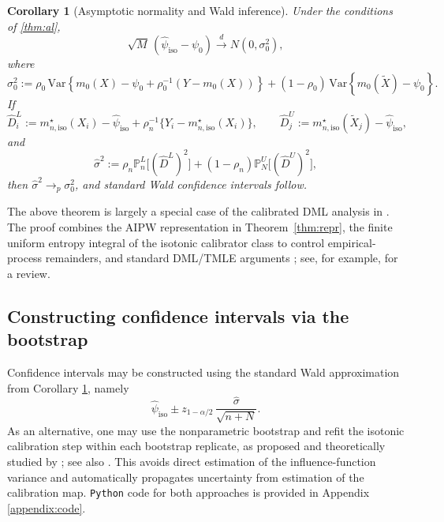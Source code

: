 \documentclass{article}
\theoremstyle{plain}
\newtheorem{corollary}{Corollary}
\theoremstyle{definition}
\newcommand{\Var}{\mathrm{Var}}
\newcommand{\1}{\mathbbm{1}}
\newcommand{\rhozero}{\rho_0}
\newcommand{\rhon}{\rho_n}
\newcommand{\Pl}{\mathbb{P}^{L}_n}
\newcommand{\Pu}{\mathbb{P}^{U}_N}
\begin{document}
\begin{corollary}[Asymptotic normality and Wald inference]
\label{cor:normal}
Under the conditions of \cref{thm:al},
\[
\sqrt{M}\,(\widehat{\psi}_{\mathrm{iso}}-\psi_0)\overset{d}{\longrightarrow}N(0,\sigma_0^2),
\]
where
\[
\sigma_0^2
:=
\rhozero\,\Var\left\{m_0(X)-\psi_0+\rhozero^{-1}(Y-m_0(X))\right\}
+
(1-\rhozero)\,\Var\left\{m_0(\widetilde X)-\psi_0\right\}.
\]
If
\[
\widehat D_i^L := m_{n,\mathrm{iso}}^\star(X_i)-\widehat{\psi}_{\mathrm{iso}}+\rhon^{-1}\{Y_i-m_{n,\mathrm{iso}}^\star(X_i)\},
\qquad
\widehat D_j^U := m_{n,\mathrm{iso}}^\star(\widetilde X_j)-\widehat{\psi}_{\mathrm{iso}},
\]
and
\[
\widehat \sigma^2
:=
\rhon \Pl\bigl[(\widehat D^L)^2\bigr]
+
(1-\rhon)\Pu\bigl[(\widehat D^U)^2\bigr],
\]
then \(\widehat\sigma^2 \to_p \sigma_0^2\), and standard Wald confidence intervals follow.
\end{corollary}

The above theorem is largely a special case of the calibrated DML analysis in \cite{van2024automatic}. The proof combines the AIPW representation in Theorem~\ref{thm:repr}, the finite uniform entropy integral of the isotonic calibrator class to control empirical-process remainders, and standard DML/TMLE arguments \citep{bickel1993efficient,vanderlaanunified,bang2005doubly,vanderLaanRose2011}; see, for example, \citet{kennedy2024semiparametric} for a review.

\subsection{Constructing confidence intervals via the bootstrap}

 

Confidence intervals may be constructed using the standard Wald approximation from Corollary \ref{cor:normal}, namely
\[
\widehat{\psi}_{\mathrm{iso}}
\pm
z_{1-\alpha/2}\,\frac{\hat\sigma}{\sqrt{n+N}}.
\]
As an alternative, one may use the nonparametric bootstrap and refit the isotonic calibration step within each bootstrap replicate, as proposed and theoretically studied by \citet{van2024automatic}; see also \citet{tang2024consistency}. This avoids direct estimation of the influence-function variance and automatically propagates uncertainty from estimation of the calibration map.  \texttt{Python} code for both approaches is provided in Appendix \ref{appendix:code}.
\end{document}
